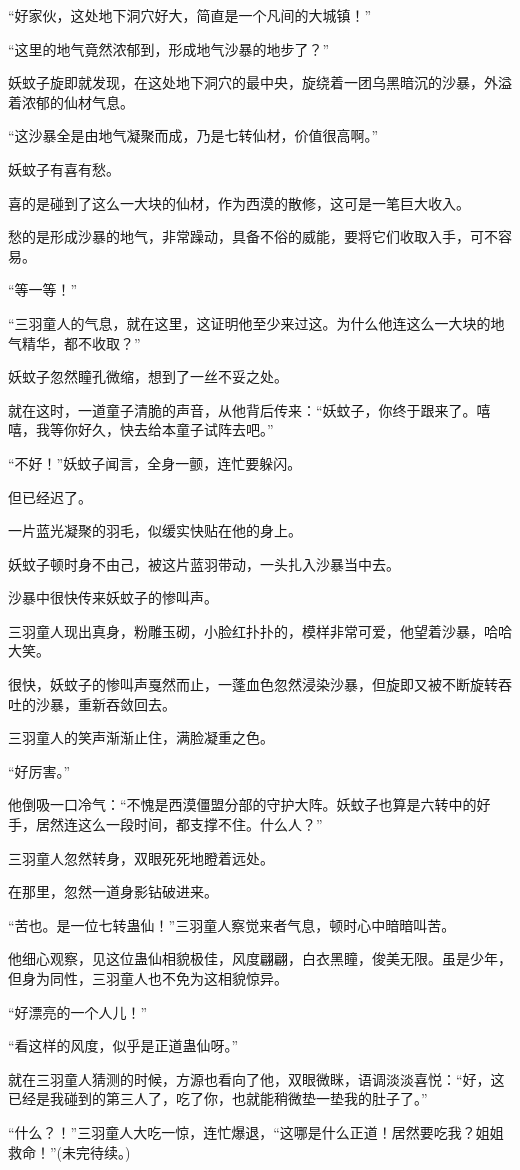 \begin{this_body}
“好家伙，这处地下洞穴好大，简直是一个凡间的大城镇！”

“这里的地气竟然浓郁到，形成地气沙暴的地步了？”

妖蚊子旋即就发现，在这处地下洞穴的最中央，旋绕着一团乌黑暗沉的沙暴，外溢着浓郁的仙材气息。

“这沙暴全是由地气凝聚而成，乃是七转仙材，价值很高啊。”

妖蚊子有喜有愁。

喜的是碰到了这么一大块的仙材，作为西漠的散修，这可是一笔巨大收入。

愁的是形成沙暴的地气，非常躁动，具备不俗的威能，要将它们收取入手，可不容易。

“等一等！”

“三羽童人的气息，就在这里，这证明他至少来过这。为什么他连这么一大块的地气精华，都不收取？”

妖蚊子忽然瞳孔微缩，想到了一丝不妥之处。

就在这时，一道童子清脆的声音，从他背后传来：“妖蚊子，你终于跟来了。嘻嘻，我等你好久，快去给本童子试阵去吧。”

“不好！”妖蚊子闻言，全身一颤，连忙要躲闪。

但已经迟了。

一片蓝光凝聚的羽毛，似缓实快贴在他的身上。

妖蚊子顿时身不由己，被这片蓝羽带动，一头扎入沙暴当中去。

沙暴中很快传来妖蚊子的惨叫声。

三羽童人现出真身，粉雕玉砌，小脸红扑扑的，模样非常可爱，他望着沙暴，哈哈大笑。

很快，妖蚊子的惨叫声戛然而止，一蓬血色忽然浸染沙暴，但旋即又被不断旋转吞吐的沙暴，重新吞敛回去。

三羽童人的笑声渐渐止住，满脸凝重之色。

“好厉害。”

他倒吸一口冷气：“不愧是西漠僵盟分部的守护大阵。妖蚊子也算是六转中的好手，居然连这么一段时间，都支撑不住。什么人？”

三羽童人忽然转身，双眼死死地瞪着远处。

在那里，忽然一道身影钻破进来。

“苦也。是一位七转蛊仙！”三羽童人察觉来者气息，顿时心中暗暗叫苦。

他细心观察，见这位蛊仙相貌极佳，风度翩翩，白衣黑瞳，俊美无限。虽是少年，但身为同性，三羽童人也不免为这相貌惊异。

“好漂亮的一个人儿！”

“看这样的风度，似乎是正道蛊仙呀。”

就在三羽童人猜测的时候，方源也看向了他，双眼微眯，语调淡淡喜悦：“好，这已经是我碰到的第三人了，吃了你，也就能稍微垫一垫我的肚子了。”

“什么？！”三羽童人大吃一惊，连忙爆退，“这哪是什么正道！居然要吃我？姐姐救命！”(未完待续。)

\end{this_body}

